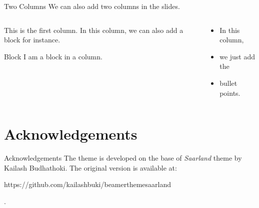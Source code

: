 \documentclass[aspectratio=169]{beamer}
\begin{document}
\begin{frame}{Two Columns}
	We can also add two columns in the slides.
	\begin{columns}[t]
		\begin{column}[T]{0.4\textwidth}
			This is the first column. In this column, we can also add a block for instance.
			\vspace{1em}
			\begin{block}{Block}
				I am a block in a column.
			\end{block}
		\end{column}
		\begin{column}[T]{0.4\textwidth}
			\begin{itemize}
				\item In this column,
				\item we just add the
				\item bullet points.
			\end{itemize}
		\end{column}
	\end{columns}
\end{frame}

\section{Acknowledgements}

\begin{frame}{Acknowledgements}
	The theme is developed on the base of \textsl{Saarland} theme by Kailash Budhathoki. The original version is available at:
	\begin{url}
		https://github.com/kailashbuki/beamerthemesaarland
	\end{url}.
\end{frame}
\end{document}
